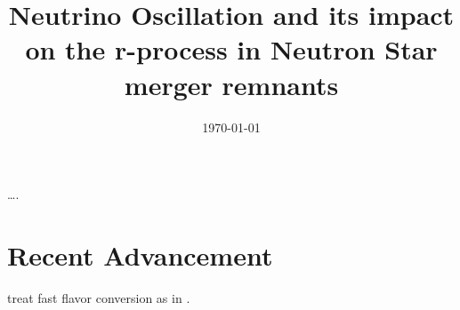\documentclass[%
 reprint,
 amsmath,
 amssymb,
 aps,
 prl,
 twocolumn,
]{revtex4-2}
\begin{document}

\title{Neutrino Oscillation and its impact on the r-process in Neutron Star merger remnants}%


\date{\today}%

\begin{abstract}

\end{abstract}

\maketitle

\section{}

\begin{acknowledgments}
\dots.

\end{acknowledgments}

\appendix
\section{Recent Advancement}
\citet{Li2021Neutri} treat fast flavor conversion as in \citet{Sarikas2012Suppre}.


\end{document}
